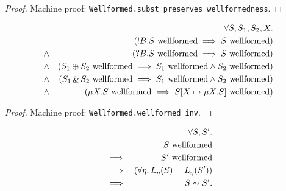 \documentclass{llncs}
\newcommand*{\sequiv}{\sim}
\newcommand*{\send}{\mathord{!}}
\newcommand*{\recv}{\mathord{?}}
\newcommand*{\echoice}{\oplus}
\newcommand*{\ichoice}{\mathop{\&}}
\newcommand*{\wf}[1]{\text{$#1$ {\normalfont \rmfamily wellformed}}}
\renewcommand*{\|}{\;|\;}
\newcommand*{\machproofc}[1]{Machine proof: \code{#1}.}
\newcommand*{\code}[1]{\texttt{#1}}
\begin{document}
\begin{proof}
  \machproofc{Wellformed.subst\_preserves\_wellformedness}
\end{proof}


\begin{lemma}
  \label{lemma:inversion_wellformedness}
  \begin{eqnarray*}
    &&      \forall S, S_1, S_2, X. \\
    &&      (\wf{\send B.S} \implies \wf{S}) \\
    &\land& (\wf{\recv B.S} \implies \wf{S}) \\
    &\land& (\wf{S_1 \echoice S_2} \implies \wf{S_1} \land \wf{S_2}) \\
    &\land& (\wf{S_1 \ichoice S_2} \implies \wf{S_1} \land \wf{S_2}) \\
    &\land& (\wf{\mu X.S} \implies \wf{S[X \mapsto \mu X.S]})
  \end{eqnarray*}
\end{lemma}

\begin{proof}
  \machproofc{Wellformed.wellformed\_inv}
\end{proof}


\begin{theorem}
  \label{th:equality_equivalence}
  \begin{eqnarray*}
    &&         \forall S, S'. \\
    &&         \wf{S} \\
    &\implies& \wf{S'} \\
    &\implies& (\forall \eta.\, L_\eta(S) = L_\eta(S')) \\
    &\implies& S \sequiv S'.
  \end{eqnarray*}
\end{theorem}
\end{document}
